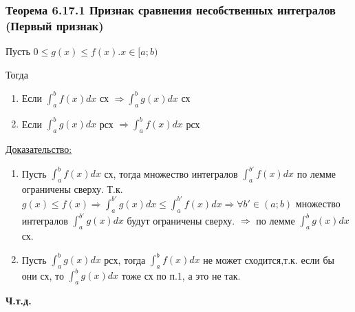 \documentclass[12pt]{article}
\begin{document}
    \subsubsection*{Теорема 6.17.1 Признак сравнения несобственных интегралов (Первый признак)}\label{th:6.17.1}
    Пусть $0\leq g(x) \leq f(x). x\in [a;b)$\par\noindent
    Тогда \begin{enumerate}
        \item Если $\int_{a}^{b}f(x)dx$ сх $\Rightarrow \int_{a}^{b}g(x)dx$ сх
        \item Если $\int_{a}^{b}g(x)dx$ рсх $\Rightarrow \int_{a}^{b}f(x)dx$ рсх 
    \end{enumerate}
    \underline{Доказательство:}
    \begin{adjustwidth}{1.5em}{1.5em}
        \begin{enumerate}
            \item Пусть $\int_{a}^{b}f(x)dx $ сх, тогда множество интегралов $\int_{a}^{b'}f(x)dx$ по лемме ограничены сверху.
            Т.к. $g(x) \leq f(x) \Rightarrow \int_{a}^{b'}g(x)dx \leq \int_{a}^{b'}f(x)dx \Rightarrow \forall b' \in (a;b)$ множество интегралов $\int_{a}^{b'}
            g(x)dx$ будут ограничены сверху. $\Rightarrow$ по лемме $\int_{a}^{b}g(x)dx$ сх.
            \item Пусть $\int_{a}^{b}g(x)dx$ рсх, тогда $\int_{a}^{b}f(x)dx$ не может сходится,т.к. если бы они сх, то $\int_{a}^{b}g(x)dx$ тоже сх по п.1, а это не так.
        \end{enumerate}
        \begin{center}
            \textbf{Ч.т.д.}
        \end{center}
    \end{adjustwidth}
\end{document}
